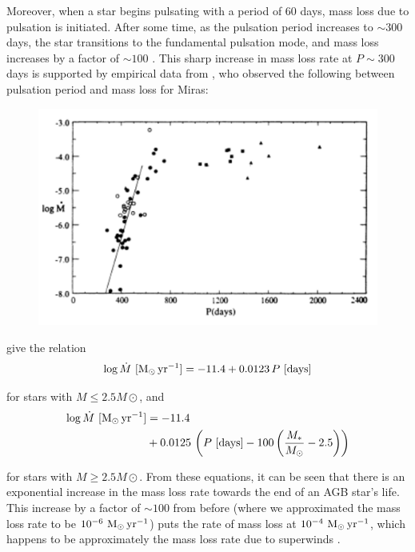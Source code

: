 \documentclass[twocolumn]{aastex63}
\begin{document}
Moreover, when a star begins pulsating with a period of 60 days, mass loss due to pulsation is initiated. After some time, as the pulsation period increases to $\sim 300$ days, the star transitions to the fundamental pulsation mode, and mass loss increases by a factor of $\sim 100$ \citep{mcdonald, bedijn}. This sharp increase in mass loss rate at $P\sim 300$ days is supported by empirical data from \cite{vassiliadis}, who observed the following between pulsation period and mass loss for Miras:
\begin{figure}[ht]
    \includegraphics[width=\textwidth]{pulsation_massloss.png}
\end{figure}

\cite{vassiliadis} give the relation 
\begin{align*}
    \log \dot M~{[\rm M_\odot\,yr^{-1}]} = -11.4 + 0.0123\,P~{[\rm days]}
\end{align*}

for stars with $M\leq 2.5M\odot$, and
\begin{align*}
    \log \dot M~{[\rm M_\odot\,yr^{-1}]} &= -11.4 \\
                                         &+ 0.0125\,\left(P~{[\rm days]} - 100\left(\frac{M_*}{M_\odot} - 2.5\right)\right)
\end{align*}

for stars with $M\geq 2.5M\odot$. From these equations, it can be seen that there is an exponential increase in the mass loss rate towards the end of an AGB star's life. This increase by a factor of $\sim 100$ from before (where we approximated the mass loss rate to be $10^{-6}~{\rm M_\odot\,yr^{-1}}$) puts the rate of mass loss at  $10^{-4}~{\rm M_\odot\,yr^{-1}}$, which happens to be approximately the mass loss rate due to superwinds \citep{iben}. 
\end{document}
